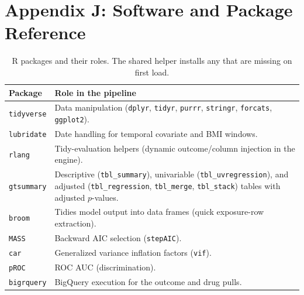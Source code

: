 \documentclass[11pt]{article}
\newcommand{\code}[1]{\texttt{\small #1}}
\begin{document}
\section{Appendix J: Software and Package Reference}
\begin{table}[h]
\centering
\footnotesize
\begin{tabular}{@{}p{3.0cm}p{10.4cm}@{}}
\toprule
\textbf{Package} & \textbf{Role in the pipeline} \\
\midrule
\code{tidyverse} & Data manipulation (\code{dplyr}, \code{tidyr}, \code{purrr}, \code{stringr}, \code{forcats}, \code{ggplot2}). \\
\code{lubridate} & Date handling for temporal covariate and BMI windows. \\
\code{rlang} & Tidy-evaluation helpers (dynamic outcome/column injection in the engine). \\
\code{gtsummary} & Descriptive (\code{tbl_summary}), univariable (\code{tbl_uvregression}), and adjusted (\code{tbl_regression}, \code{tbl_merge}, \code{tbl_stack}) tables with adjusted $p$-values. \\
\code{broom} & Tidies model output into data frames (quick exposure-row extraction). \\
\code{MASS} & Backward AIC selection (\code{stepAIC}). \\
\code{car} & Generalized variance inflation factors (\code{vif}). \\
\code{pROC} & ROC AUC (discrimination). \\
\code{bigrquery} & BigQuery execution for the outcome and drug pulls. \\
\bottomrule
\end{tabular}
\caption{R packages and their roles. The shared helper installs any that are missing on first load.}
\end{table}

\end{document}
